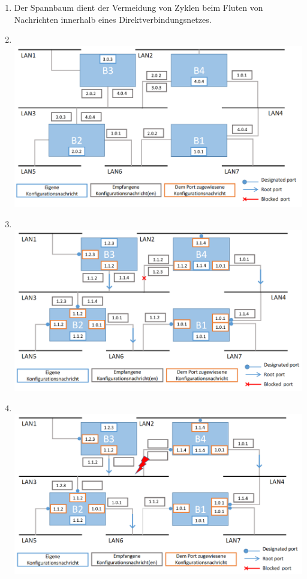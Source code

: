\documentclass[12pt]{scrartcl}
\begin{document}
\setcounter{exnum}{1}
    \begin{enumerate}[label=(\alph*)]
        \item   Der Spannbaum dient der Vermeidung von Zyklen beim Fluten von Nachrichten innerhalb eines Direktverbindungsnetzes.
        \item  \ \\ \includegraphics[width = 0.9 \textwidth]{grafiken/1b.png}
        \item  \ \\  \includegraphics[width = 0.9 \textwidth]{grafiken/1c.png}
        \newpage
        \item  \ \\ \includegraphics[width = 0.9 \textwidth]{grafiken/1d.png}
    \end{enumerate}
 
\end{document}
